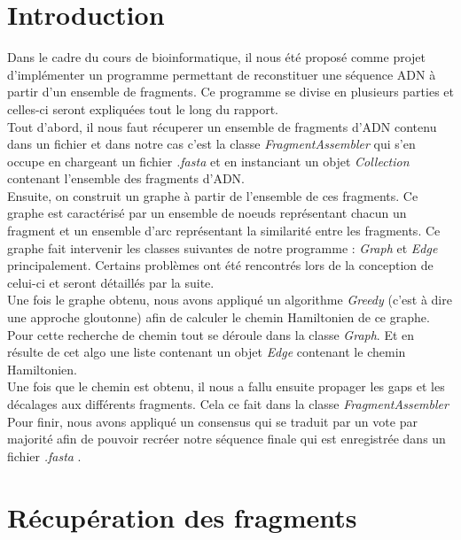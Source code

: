 \documentclass[a4paper, 12pt]{article}
\begin{document}
\tableofcontents

\newpage

\section{Introduction}

	Dans le cadre du cours de bioinformatique, il nous été proposé comme projet d'implémenter un programme permettant de reconstituer une séquence ADN à partir d'un ensemble de fragments. Ce programme se divise en plusieurs parties et celles-ci seront expliquées tout le long du rapport.\\

 
	Tout d'abord, il nous faut récuperer un ensemble de fragments d'ADN contenu dans un fichier et dans notre cas c'est la classe \textit{FragmentAssembler} qui s'en occupe en chargeant un fichier \textit{.fasta} et en instanciant un objet \textit{Collection} contenant l'ensemble des fragments d'ADN.\\

	Ensuite, on construit un graphe à partir de l'ensemble de ces fragments. Ce graphe est caractérisé par un ensemble de noeuds représentant chacun un fragment et un ensemble d'arc représentant la similarité entre les fragments. Ce graphe fait intervenir les classes suivantes de notre programme : \textit{Graph} et \textit{Edge} principalement. Certains problèmes ont été rencontrés lors de la conception de celui-ci et seront détaillés par la suite.\\

	Une fois le graphe obtenu, nous avons appliqué un algorithme \textit{Greedy} (c'est à dire une approche gloutonne) afin de calculer le chemin Hamiltonien de ce graphe. Pour cette recherche de chemin tout se déroule dans la classe \textit{Graph}. Et en résulte de cet algo une liste contenant un objet \textit{Edge} contenant le chemin Hamiltonien.\\

	Une fois que le chemin est obtenu, il nous a fallu ensuite propager les gaps et les décalages aux différents fragments. Cela ce fait dans la classe \textit{FragmentAssembler}\\

	Pour finir, nous avons appliqué un consensus qui se traduit par un vote par majorité afin de pouvoir recréer notre séquence finale qui est enregistrée dans un fichier \textit{.fasta} .
\newpage
\section{Récupération des fragments}
\end{document}
